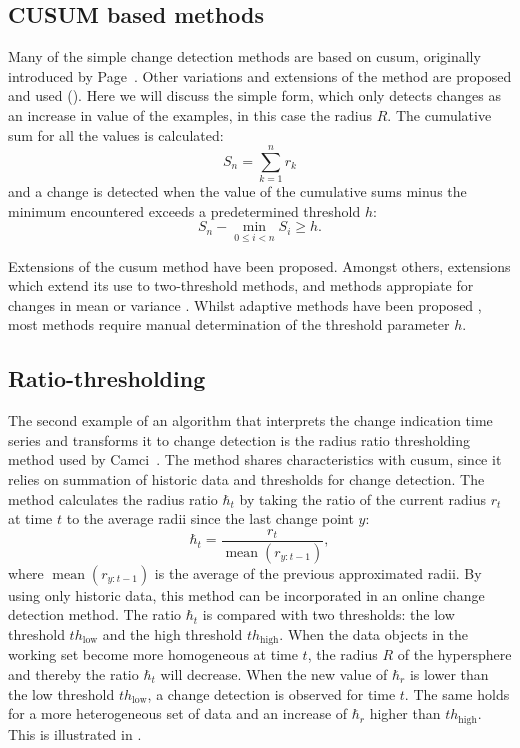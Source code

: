 \subsection{CUSUM based methods}
Many of the simple change detection methods are based on \gls{cusum}, originally introduced by Page~\cite{page1954continuous}.
Other variations and extensions of the method are proposed and used (\cite{inclan1994use,alippi2006adaptive,hsu2007mosum}).
Here we will discuss the simple form, which only detects changes as an increase in value of the examples, in this case the radius $R$.
The cumulative sum for all the values is calculated:
\begin{equation}
  S_n = \sum_{k=1}^n r_k
\end{equation}
and a change is detected when the value of the cumulative sums minus the minimum encountered exceeds a predetermined threshold $h$:
\begin{equation}
  S_n - \operatorname*{min}_{0 \le i < n} S_i \ge h.
\end{equation}

Extensions of the \gls{cusum} method have been proposed.
Amongst others, extensions which extend its use to two-threshold methods, and methods appropiate for changes in mean or variance \cite{inclan1994use}.
Whilst adaptive methods have been proposed \cite{alippi2006adaptive}, most methods require manual determination of the threshold parameter $h$.

\subsection{Ratio-thresholding}\label{subsec:ratio_thresholding}
The second example of an algorithm that interprets the change indication time series and transforms it to change detection is the radius ratio thresholding method used by Camci~\cite{camci2010change}.
The method shares characteristics with \gls{cusum}, since it relies on summation of historic data and thresholds for change detection.
The method calculates the radius ratio $\hbar_t$ by taking the ratio of the current radius $r_t$ at time $t$ to the average radii since the last change point $y$:
\begin{equation}\label{eq:ratio_radius}
  \hbar_t = \frac{r_t}{\operatorname*{mean}(r_{y:t-1})},
\end{equation}
where $\operatorname*{mean}(r_{y:t-1})$ is the average of the previous approximated radii.
By using only historic data, this method can be incorporated in an online change detection method.
The ratio $\hbar_t$ is compared with two thresholds: the low threshold $th_\text{low}$ and the high threshold $th_\text{high}$.
When the data objects in the working set become more homogeneous at time $t$, the radius $R$ of the hypersphere and thereby the ratio $\hbar_t$ will decrease.
When the new value of $\hbar_r$ is lower than the low threshold $th_\text{low}$, a change detection is observed for time $t$.
The same holds for a more heterogeneous set of data and an increase of $\hbar_r$ higher than $th_\text{high}$.
This is illustrated in .

